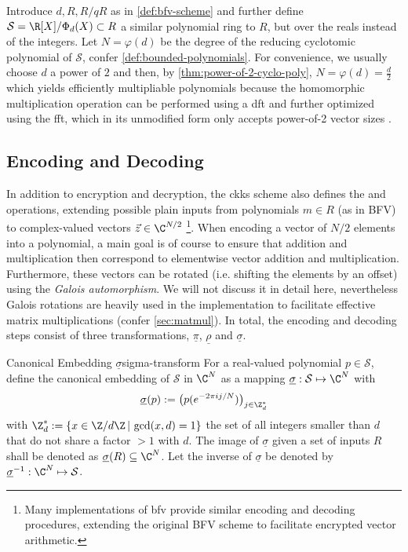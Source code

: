 Introduce $d, R, R/qR$ as in \cref{def:bfv-scheme} and further define $\mathcal{S} = \R[X] / \Phi_d(X) \subset R$ a similar polynomial ring to $R$, but over the reals instead of the integers.
Let $N = \varphi(d)$ be the degree of the reducing cyclotomic polynomial of $\mathcal{S}$, confer \cref{def:bounded-polynomials}.
For convenience, we usually choose $d$ a power of $2$ and then, by \cref{thm:power-of-2-cyclo-poly}, $N = \varphi(d) = \frac{d}{2}$ which yields efficiently multipliable polynomials because the homomorphic multiplication operation can be performed using a \gls{dft} and further optimized using the \gls{fft}, which in its unmodified form only accepts power-of-2 vector sizes \parencite{2017-ckks-original}.

\subsection{Encoding and Decoding}
In addition to encryption and decryption, the \gls{ckks} scheme also defines the  and  operations, extending possible plain inputs from polynomials $m \in R$ (as in BFV) to complex-valued vectors $\vec{z} \in \C^{N/2}$
\footnote{Many implementations of \gls{bfv} provide similar encoding and decoding procedures, extending the original BFV scheme \parencite{2012-fv-original} to facilitate encrypted vector arithmetic.}.
When encoding a vector of $N/2$ elements into a polynomial, a main goal is of course to ensure that addition and multiplication then correspond to elementwise vector addition and multiplication.
Furthermore, these vectors can be rotated (i.e. shifting the elements by an offset) using the \textit{Galois automorphism}.
We will not discuss it in detail here, nevertheless Galois rotations are heavily used in the implementation to facilitate effective matrix multiplications (confer \cref{sec:matmul}).
In total, the encoding and decoding steps consist of three transformations, $\underline{\pi}$, $\underline{\rho}$ and $\underline{\sigma}$.

\begin{definition}{Canonical Embedding $\underline{\sigma}$}{sigma-transform}
  For a real-valued polynomial $p \in \mathcal{S}$, define the canonical embedding of $\mathcal{S}$ in $\C^N$ as a mapping $\underline{\sigma}: \mathcal{S} \mapsto \C^N$ with $$\underline{\sigma}(p) := \big(p(e^{-2\pi i j / N})\big)_{j \in \Z_d^*}$$
  with $\Z_d^* := \{x \in \Z / d\Z \,|\, \gcd(x, d) = 1\}$ the set of all integers smaller than $d$ that do not share a factor $> 1$ with $d$.
  The image of $\underline{\sigma}$ given a set of inputs $R$ shall be denoted as $\underline{\sigma}(R) \subseteq \C^N$.
  Let the inverse of $\underline{\sigma}$ be denoted by $\underline{\sigma}\inv: \C^N \mapsto \mathcal{S}$.
\end{definition}


